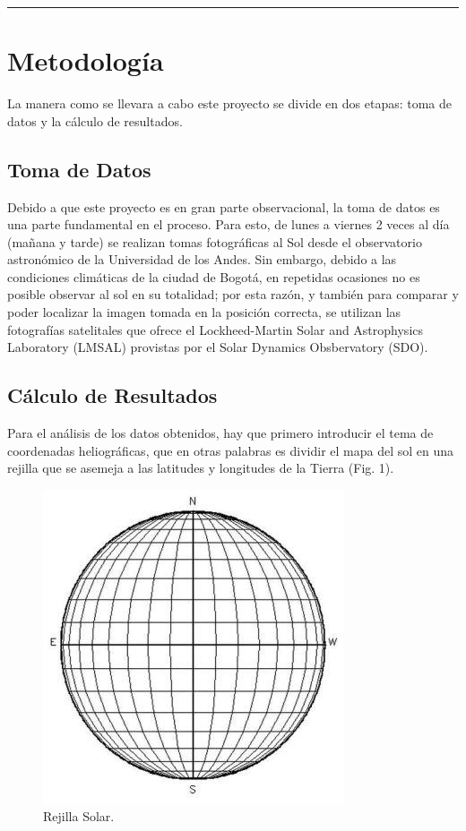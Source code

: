 \documentclass[11pt,letterpaper]{article}
\begin{document}
\hrule

\section{Metodología}

La manera como se llevara a cabo este proyecto se divide en dos etapas: toma de datos y la cálculo de resultados.\\

\subsection{Toma de Datos}

Debido a que este proyecto es en gran parte observacional, la toma de datos es una parte fundamental en el proceso. Para esto, de lunes a viernes 2 veces al día (mañana y tarde) se realizan tomas fotográficas al Sol desde el observatorio astronómico de la Universidad de los Andes. Sin embargo, debido a las condiciones climáticas de la ciudad de Bogotá, en repetidas ocasiones no es posible observar al sol en su totalidad; por esta razón, y también para comparar y poder localizar la imagen tomada en la posición correcta, se utilizan las fotografías satelitales que ofrece el Lockheed-Martin Solar and Astrophysics Laboratory (LMSAL) provistas por el Solar Dynamics Obsbervatory (SDO).
\\

\subsection{Cálculo de Resultados}

Para el análisis de los datos obtenidos, hay que primero introducir el tema de coordenadas heliográficas, que en otras palabras es dividir el mapa del sol en una rejilla que se asemeja a las latitudes y longitudes de la Tierra (Fig. 1).
\\

\begin{figure}[h]
 \centering
 \includegraphics[width=0.7\linewidth]{./grid}
 \caption{Rejilla Solar.}
 \label{fig:grid}
 \end{figure}
 
\end{document}

